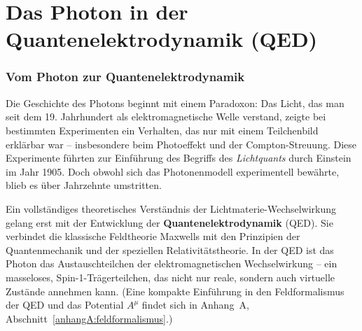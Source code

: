 \chapter{Das Photon in der Quantenelektrodynamik (QED)}
\setcounter{section}{5}
\setcounter{subsection}{0}
\setcounter{subsubsection}{1}
\setcounter{secnumdepth}{3}
\setlength{\parindent}{0pt}

\subsection{Vom Photon zur Quantenelektrodynamik}

Die Geschichte des Photons beginnt mit einem Paradoxon: Das Licht, das man seit dem 19. Jahrhundert als elektromagnetische Welle verstand, zeigte bei bestimmten Experimenten ein Verhalten, das nur mit einem Teilchenbild erklärbar war – insbesondere beim Photoeffekt und der Compton-Streuung.
Diese Experimente führten zur Einführung des Begriffs des \emph{Lichtquants} durch Einstein im Jahr 1905.
Doch obwohl sich das Photonenmodell experimentell bewährte, blieb es über Jahrzehnte umstritten.

Ein vollständiges theoretisches Verständnis der Lichtmaterie-Wechsel\-wirkung gelang erst mit der Entwicklung der \textbf{Quantenelektrodynamik} (QED).
Sie verbindet die klassische Feldtheorie Maxwells mit den Prinzipien der Quantenmechanik und der speziellen Relativitätstheorie.
In der QED ist das Photon das Austauschteilchen der elektromagnetischen Wechselwirkung – ein masseloses, Spin-1-Trägerteilchen, das nicht nur reale, sondern auch virtuelle Zustände annehmen kann.
(Eine kompakte Einführung in den Feldformalismus der QED und das Potential \(A^\mu\) findet sich in Anhang~A, Abschnitt~\ref{anhangA:feldformalismus}.)

